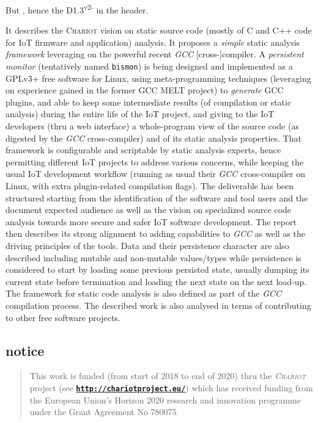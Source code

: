 \documentclass[11pt,a4paper,svgnames]{article}
\newcommand{\bmurl}[1]{{\href{#1}{\texttt{\textbf{#1}}}}}
\begin{document}
\begin{titlepage}
But {}, hence the
D1.3\textsuperscript{v2-} in the header.

It describes the \textsc{Chariot} vision on static source code (mostly
of C and C++ code for IoT firmware and application) analysis. It
proposes a \emph{simple} static analysis \emph{framework} leveraging
on the powerful recent \emph{GCC} [cross-]compiler. A \emph{persistent
  monitor} (tentatively named \texttt{bismon}) is being designed and
implemented as a GPLv3+ free software for Linux, using
meta-programming techniques (leveraging on experience gained in the
former GCC MELT project) to \emph{generate} GCC plugins, and able to
keep some intermediate results (of compilation or static analysis)
during the entire life of the IoT project, and giving to the IoT
developers (thru a web interface) a whole-program view of the source
code (as digested by the \emph{GCC} cross-compiler) and of its static
analysis properties. That framework is configurable and scriptable by
static analysis experts, hence permitting different IoT projects to
address various concerns, while keeping the usual IoT development
workflow (running as usual their \emph{GCC} cross-compiler on Linux,
with extra plugin-related compilation flags).  The deliverable has
been structured starting from the identification of the software and
tool users and the document expected audience as well as the vision on
specialized source code analysis towards more secure and safer IoT
software development. The report then describes its strong alignment
to adding capabilities to \emph{GCC} as well as the driving principles of the
tools. Data and their persistence character are also described
including mutable and non-mutable values/types while persistence is
considered to start by loading some previous persisted state, usually
dumping its current state before termination and loading the next
state on the next load-up. The framework for static code analysis is
also defined as part of the \emph{GCC} compilation process. The described
work is also analysed in terms of contributing to other free software
projects.


\subsection*{notice}

\begin{quote}
\begin{relsize}{-2}
\footnotesize This work is funded (from start of 2018 to end of
2020) thru the \emph{\textsc{Chariot}} project (see \bmurl{http://chariotproject.eu/})
which has received funding from the European Union’s Horizon 2020
research and innovation programme under the Grant Agreement No
780075.
\end{relsize}
\end{quote}
\medskip




\end{titlepage}
\end{document}
